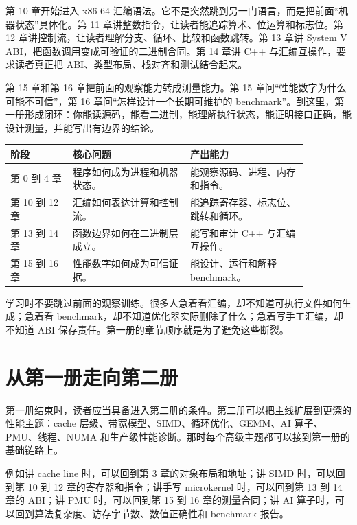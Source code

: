 第 10 章开始进入 x86-64 汇编语法。它不是突然跳到另一门语言，而是把前面“机器状态”具体化。第 11 章讲整数指令，让读者能追踪算术、位运算和标志位。第 12 章讲控制流，让读者理解分支、循环、比较和函数跳转。第 13 章讲 System V ABI，把函数调用变成可验证的二进制合同。第 14 章讲 C++ 与汇编互操作，要求读者真正把 ABI、类型布局、栈对齐和测试结合起来。

第 15 章和第 16 章把前面的观察能力转成测量能力。第 15 章问“性能数字为什么可能不可信”，第 16 章问“怎样设计一个长期可维护的 benchmark”。到这里，第一册形成闭环：你能读源码，能看二进制，能理解执行状态，能证明接口正确，能设计测量，并能写出有边界的结论。

\begin{center}
\begin{tabular}{p{0.18\linewidth}p{0.34\linewidth}p{0.34\linewidth}}
\toprule
阶段 & 核心问题 & 产出能力 \\
\midrule
第 0 到 4 章 & 程序如何成为进程和机器状态。 & 能观察源码、进程、内存和指令。 \\
第 10 到 12 章 & 汇编如何表达计算和控制流。 & 能追踪寄存器、标志位、跳转和循环。 \\
第 13 到 14 章 & 函数边界如何在二进制层成立。 & 能写和审计 C++ 与汇编互操作。 \\
第 15 到 16 章 & 性能数字如何成为可信证据。 & 能设计、运行和解释 benchmark。 \\
\bottomrule
\end{tabular}
\end{center}

学习时不要跳过前面的观察训练。很多人急着看汇编，却不知道可执行文件如何生成；急着看 benchmark，却不知道优化器实际删除了什么；急着写手工汇编，却不知道 ABI 保存责任。第一册的章节顺序就是为了避免这些断裂。

\section{从第一册走向第二册}

第一册结束时，读者应当具备进入第二册的条件。第二册可以把主线扩展到更深的性能主题：cache 层级、带宽模型、SIMD、循环优化、GEMM、AI 算子、PMU、线程、NUMA 和生产级性能诊断。那时每个高级主题都可以接到第一册的基础链路上。

例如讲 cache line 时，可以回到第 3 章的对象布局和地址；讲 SIMD 时，可以回到第 10 到 12 章的寄存器和指令；讲手写 microkernel 时，可以回到第 13 到 14 章的 ABI；讲 PMU 时，可以回到第 15 到 16 章的测量合同；讲 AI 算子时，可以回到算法复杂度、访存字节数、数值正确性和 benchmark 报告。

